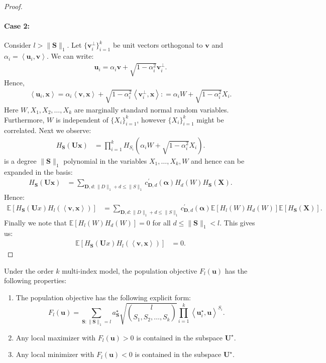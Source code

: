 \documentclass[final,12pt]{colt2018} %
\newcommand{\E}{\mathbb{E}}
\renewcommand\v[1]{{\ensuremath{\boldsymbol{#1}}}}
\newcommand\ip[1]{\left\langle #1 \right\rangle}
\begin{document}
\begin{proof}
\paragraph{Case 2:} Consider $l > \|\v S\|_1$.  Let $\{\v v^\perp_i\}_{i=1}^k$ be unit vectors orthogonal to $\v v$ and $\alpha_i = \ip{ \v u_i, \v v}$. We can write: 
\begin{align*}
    \v  u_i = \alpha_i \v v + \sqrt{1 - \alpha_i^2 } \v v^\perp_i.
\end{align*}
Hence, 
\begin{align*}
    \ip{ \v u_i, \v x} = \alpha_i  \ip{ \v v, \v x} + \sqrt{1- \alpha_i^2} \ip{ \v v^\perp_i, \v x} : = \alpha_i W + \sqrt{1-\alpha_i^2} X_i.
\end{align*}
Here $W,X_1, X_2, \dotsc, X_k$ are marginally standard normal random variables. Furthermore, $W$ is independent of $\{X_i\}_{i=1}^k$, however $\{X_i\}_{i=1}^k$ might be correlated. Next we observe: 
\begin{align*}
    H_{\v S}(\v U \v x) & = \prod_{i=1}^k H_{S_i}\left( \alpha_i W + \sqrt{1-\alpha_i^2}X_i\right).
\end{align*}
is a degree $\|\v S\|_1$ polynomial in the variables $X_1, \dotsc, X_k, W$ and hence can be expanded in the basis: 
\begin{align*}
    H_{\v S}( \v U \v x) & = \sum_{\v D,d : \v \|D\|_1 + d \leq \|S\|_1} c^\prime_{\v D, d}(\v \alpha) H_d(W) H_{\v S}(\v X).
\end{align*}
Hence: 
\begin{align*}
    \E \left[H_{\v S}(\v U x) H_l(\ip{\v v, \v x}) \right] & = \sum_{\v D,d : \v \|D\|_1 + d \leq \|S\|_1} c^\prime_{\v D, d}(\v \alpha) \E[ H_l(W) H_d(W)]\E[ H_{\v S}(\v X)].
\end{align*}
Finally we note that $\E[H_l(W)H_d(W)] = 0$ for all $d \leq \|\v S\|_1 < l$.  This gives us: 
\begin{align*}
    \E \left[H_{\v S}(\v U x) H_l(\ip{\v v, \v x}) \right] & = 0.
\end{align*}
\end{proof}
\begin{theorem}
Under the order $k$ multi-index model, the population objective $F_l(\v u)$ has the following properties: 
\begin{enumerate}
    \item The population objective has the following explicit form:
    $$F_l(\v u) = \sum_{\v S: \|\v S\|_1 = l} a_{\v S}^\star \sqrt{\binom{l}{S_1, S_2, \dotsc, S_k}} \prod_{i=1}^k \ip{ \v u^\star_i, \v u}^{S_i}.$$
    \item Any local maximizer with $F_l(\v u) > 0$ is contained in the subspace $\mathcal{\v U}^\star$. 
    \item Any local minimizer with $F_l(\v u) < 0$ is contained in the subspace $\mathcal{\v U}^\star$.
\end{enumerate}
\label{theorem: multiindex_landscape_restate}
\end{theorem}
\end{document}
